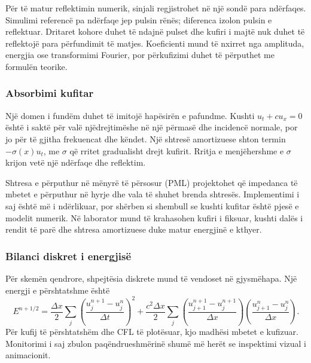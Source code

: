 Për të matur reflektimin numerik, sinjali regjistrohet në një sondë para ndërfaqes. Simulimi referencë pa ndërfaqe jep pulsin rënës; diferenca izolon pulsin e reflektuar. Dritaret kohore duhet të ndajnë pulset dhe kufiri i majtë nuk duhet të reflektojë para përfundimit të matjes. Koeficienti mund të nxirret nga amplituda, energjia ose transformimi Fourier, por përkufizimi duhet të përputhet me formulën teorike.

\subsubsection{Absorbimi kufitar}
Një domen i fundëm duhet të imitojë hapësirën e pafundme. Kushti $u_t+cu_x=0$ është i saktë për valë njëdrejtimëshe në një përmasë dhe incidencë normale, por jo për të gjitha frekuencat dhe këndet. Një shtresë amortizuese shton termin $-\sigma(x)u_t$, me $\sigma$ që rritet gradualisht drejt kufirit. Rritja e menjëhershme e $\sigma$ krijon vetë një ndërfaqe dhe reflektim.

Shtresa e përputhur në mënyrë të përsosur (PML) projektohet që impedanca të mbetet e përputhur në hyrje dhe vala të shuhet brenda shtresës. Implementimi i saj është më i ndërlikuar, por shërben si shembull se kushti kufitar është pjesë e modelit numerik. Në laborator mund të krahasohen kufiri i fiksuar, kushti dalës i rendit të parë dhe shtresa amortizuese duke matur energjinë e kthyer.

\subsubsection{Bilanci diskret i energjisë}
Për skemën qendrore, shpejtësia diskrete mund të vendoset në gjysmëhapa. Një energji e përshtatshme është
\begin{equation}
 E^{n+1/2}=\frac{\Delta x}{2}\sum_j
 \left(\frac{u_j^{n+1}-u_j^n}{\Delta t}\right)^2
 +\frac{c^2\Delta x}{2}\sum_j
 \left(\frac{u_{j+1}^{n+1}-u_j^{n+1}}{\Delta x}\right)
 \left(\frac{u_{j+1}^{n}-u_j^{n}}{\Delta x}\right).
\end{equation}
Për kufij të përshtatshëm dhe CFL të plotësuar, kjo madhësi mbetet e kufizuar. Monitorimi i saj zbulon paqëndrueshmërinë shumë më herët se inspektimi vizual i animacionit.
